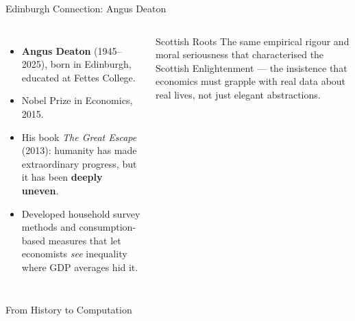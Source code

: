 \documentclass[aspectratio=169, 10pt]{beamer}
\begin{document}
\begin{frame}{Edinburgh Connection: Angus Deaton}
\begin{columns}[T]
\begin{itemize}
  \item \textbf{Angus Deaton} (1945--2025), born in Edinburgh, educated
        at Fettes College.
  \item Nobel Prize in Economics, 2015.
  \item His book \textit{The Great Escape} (2013): humanity has made
        extraordinary progress, but it has been \textbf{deeply uneven}.
  \item Developed household survey methods and consumption-based
        measures that let economists \textit{see} inequality where
        GDP averages hid it.
\end{itemize}
\begin{block}{Scottish Roots}
The same empirical rigour and moral seriousness that characterised
the Scottish Enlightenment --- the insistence that economics must
grapple with real data about real lives, not just elegant abstractions.
\end{block}
\end{columns}
\end{frame}

\begin{frame}{From History to Computation}
\begin{center}
\end{center}
\end{frame}
\end{document}
